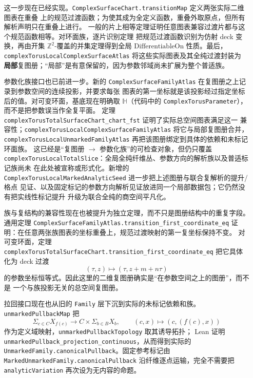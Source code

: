 \documentclass[UTF8,fontset=none,a4paper,11pt]{ctexart}
\begin{document}
这一步现在已经实现。\texttt{ComplexSurfaceChart.transitionMap} 定义两张实际二维图表在重叠
上的规范过渡函数；为使其成为全定义函数，重叠外取原点，但所有解析声明只在重叠上进行。
一般的片上相等定理证明任意图表兼容过渡片都与这个规范函数相等。对环面族，逐片识别定理
把规范过渡函数识别为仿射 deck 变换，再由开集 \(\mathbb Z^2\)-覆盖的并集定理得到全局
\(\mathrm{DifferentiableOn}\) 性质。最后，
\texttt{complexTorusLocalComplexSurfaceAtlas} 将这些实际图表及其全纯过渡封装为
\textbf{局部}复图册；“局部”是有意保留的，因为参数邻域尚未扩展为整个普适族。

参数化族接口也已前进一步。新的
\texttt{ComplexSurfaceFamilyAtlas} 在复图册之上记录到参数空间的连续投影，并要求每张
图表的第一坐标就是该投影经过指定坐标后的值。对可变环面，基底现在明确取
\(\mathbb H\)（代码中的 \texttt{ComplexTorusParameter}），而不是把参数误当作全复平面。
定理 \texttt{complexTorusTotalSurfaceChart\_chart\_fst} 证明了实际总空间图表满足这一
兼容性；\texttt{complexTorusLocalComplexSurfaceFamilyAtlas} 将它与局部复图册合并，
\texttt{complexTorusLocalUnmarkedFamilyAtlas} 再把该图册绑定到具体的依赖和未标记环面族。
这已经是“复图册 \(\to\) 参数化族”的可检查对象，但仍只覆盖
\texttt{complexTorusLocalTotalSlice}：全局全纯纤维丛、参数方向的解析族以及普适标记族尚未
在此处被宣称或形式化。新增的
\texttt{ComplexTorusLocalMarkedAnalyticSeed} 进一步把上述图册与联合复解析的提升/格点
见证、以及固定标记的参数方向解析见证放进同一个局部数据包；它仍然没有把实线性标记提升
升级为联合全纯的商空间平凡化。

族与复结构的兼容性现在也被提升为独立定理，而不只是图册结构中的重复字段。
通用定理
\texttt{ComplexSurfaceFamilyAtlas.\allowbreak transition\_first\_coordinate\_eq}
证明：在任意两张族图表的坐标重叠上，规范过渡映射的第一复坐标保持不变。
对可变环面，定理
\texttt{complexTorusTotalSurfaceChart.\allowbreak transition\_first\_coordinate\_eq}
把它具体化为 deck 过渡
\[
  (\tau,z)\longmapsto(\tau,z+m+n\tau)
\]
的参数坐标恒等式。因此这里的二维复图册确实是“在参数空间之上的图册”，而不是
一个与族投影无关的总空间复图册。

拉回接口现在也从旧的 \texttt{Family} 层下沉到实际的未标记依赖和族。
\texttt{unmarkedPullbackMap} 把
\[
  \Sigma_{c\in C}X_{f(c)}
  \longrightarrow C\times\Sigma_{b\in B}X_b,
  \qquad
  (c,x)\longmapsto(c,(f(c),x))
\]
作为定义域映射，\texttt{unmarkedPullback\allowbreak Topology} 取其诱导拓扑；
Lean 证明
\texttt{unmarkedPullback\allowbreak\_projection\allowbreak\_continuous}，从而得到实际的
\texttt{UnmarkedFamily.\allowbreak canonicalPullback}。固定参考标记由
\texttt{MarkedUnmarkedFamily.\allowbreak canonicalPullback} 沿纤维逐点运输，完全不需要把
\texttt{analyticVariation} 再次设为无内容的命题。
\end{document}
